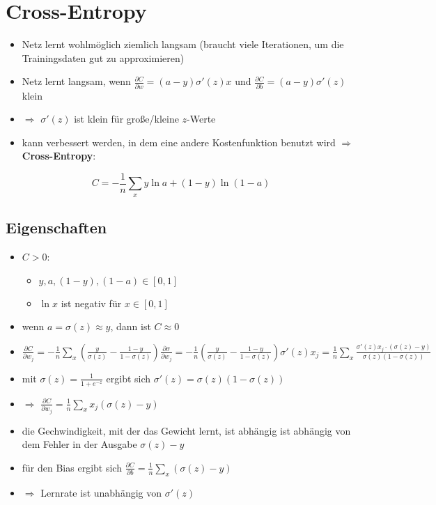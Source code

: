 \section{Cross-Entropy}

\begin{itemize}
  \item Netz lernt wohlmöglich ziemlich langsam (braucht viele Iterationen, um die Trainingsdaten gut zu approximieren)
  \item Netz lernt langsam, wenn $\frac{\partial C}{\partial w} = (a-y)\sigma'(z)x$ und $\frac{\partial C}{\partial b} = (a-y)\sigma'(z)$ klein
  \item $\Rightarrow$ $\sigma'(z)$ ist klein für große/kleine $z$-Werte
  \item kann verbessert werden, in dem eine andere Kostenfunktion benutzt wird $\Rightarrow$ \textbf{Cross-Entropy}:
\end{itemize}

\begin{equation*}
  C = - \frac{1}{n} \sum_x y \ln a + (1 - y) \ln (1 - a)
\end{equation*}

\subsection{Eigenschaften}

\begin{itemize}
  \item $C > 0$:
  \begin{itemize}
    \item $y, a, (1-y), (1 - a) \in [0,1]$
    \item $\ln x$ ist negativ für $x \in [0,1]$
  \end{itemize}
\item wenn $a = \sigma(z) \approx y$, dann ist $C \approx 0$
  \item $\frac{\partial C}{\partial w_j} = - \frac{1}{n} \sum_x {( \frac{y}{\sigma(z)} - \frac{1-y}{1-\sigma(z)} )} \frac{\partial \sigma}{\partial w_j} = - \frac{1}{n} {( \frac{y}{\sigma(z)} - \frac{1-y}{1-\sigma(z)} )} \sigma'(z) x_j = \frac{1}{n} \sum_x \frac{\sigma'(z)x_j \cdot (\sigma(z) - y)}{\sigma(z)(1-\sigma(z))}$
  \item mit $\sigma(z)= \frac{1}{1 + e^{-z}}$ ergibt sich $\sigma'(z)=\sigma(z)(1-\sigma(z))$
  \item $\Rightarrow$ $\frac{\partial C}{\partial w_j} = \frac{1}{n} \sum_x x_j (\sigma(z) - y)$
  \item die Gechwindigkeit, mit der das Gewicht lernt, ist abhängig ist abhängig von dem Fehler in der Ausgabe $\sigma(z)-y$
  \item für den Bias ergibt sich $\frac{\partial C}{\partial b} = \frac{1}{n} \sum_x (\sigma(z) - y)$
  \item $\Rightarrow$ Lernrate ist unabhängig von $\sigma'(z)$
\end{itemize}
